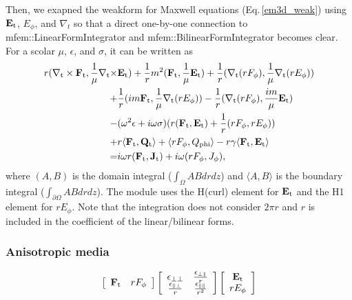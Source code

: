 \documentclass[11pt,a4paper,draft]{report}
\begin{document}
Then, we exapned the weakform for Maxwell equations (Eq.\,\ref{em3d_weak}) using $\mathbf{E}_{\rm t}$, $E_{\phi}$, and $\nabla_{t}$ so that a direct one-by-one connection to mfem::LinearFormIntegrator and mfem::BilinearFormIntegrator becomes clear.
For a scolar $\mu$, $\epsilon$, and $\sigma$, it can be written as 
 \begin{align}
r(\nabla_{\rm t} \times \mathbf{F}_{\rm t},  \frac{1}{\mu}\nabla_{\rm t}  \times & \mathbf{E}_{\rm t}) 
+\frac{1}{r} m^2(\mathbf{F}_{\rm t}, \frac{1}{\mu}\mathbf{E}_{\rm t})
+ \frac{1}{r} (\nabla_{\rm t} (rF_{\rm \phi}), \frac{1}{\mu}\nabla_{\rm t} (rE_{\rm \phi}))
 \notag \\
+& \frac{1}{r} (im \mathbf{F}_{\rm t}, \frac{1}{\mu}\nabla_{\rm t} (rE_{\rm \phi}))
- \frac{1}{r} (\nabla_{\rm t} (rF_{\rm \phi}), \frac{im}{\mu} \mathbf{E}_{\rm t})
 \notag \\
 -& (\omega^2 \epsilon+ i \omega \sigma) ( r( \mathbf{F}_{\rm t}, \mathbf{E}_{\rm t}) + \frac{1}{r}(rF_{\rm \phi}, rE_{\rm \phi})) 
 \notag \\
 +& r \langle \mathbf{F}_{\rm t},  \mathbf{Q}_{\rm t} \rangle + \langle rF_{\rm \phi}, Q_{\rm phi} \rangle -r \gamma \langle \mathbf{F}_{\rm t}, \mathbf{E}_{\rm t} \rangle
 \notag \\
 =& i \omega r ( \mathbf{F}_{\rm t}, \mathbf{J}_{\rm t} ) + i \omega ( rF_{\rm \phi}, J_{\rm \phi} ), \label{em2da_weak}
 \end{align}
 where $(A , B)$ is the domain integral ($\int_{\Omega} AB drdz$) and $\langle A, B \rangle $ is the boundary integral ($\int_{\partial \Omega} ABdrdz$). The module uses the H(curl) element for $\mathbf{E}_{\rm t}$ and the H1 element for $rE_{\phi}$. Note that the integration does not consider $2 \pi r$ and $r$ is included in the coefficient of the linear/bilinear forms. 
 
 \subsubsection{Anisotropic media}
 

 \begin{equation}
 \left[ {\begin{array}{*{20}c}
\mathbf{F}_{\rm t}  & rF_{\rm \phi}\\
\end{array}}\right]
\left[ {\begin{array}{*{20}c}
\mathbf{\epsilon}_{\perp \perp}  & \frac{\mathbf{\epsilon}_{\perp \parallel}}{r}\\
\frac{\mathbf{\epsilon}_{\parallel \perp}}{r} & \frac{\mathbf{\epsilon}_{\parallel \parallel}}{r^2}\\
\end{array}}\right]
 \left[ {\begin{array}{*{20}c}
\mathbf{E}_{\rm t}  \\
rE_{\rm \phi}\\
\end{array}}\right]
\label{response_matrix_eq}
\end{equation}
\end{document}
